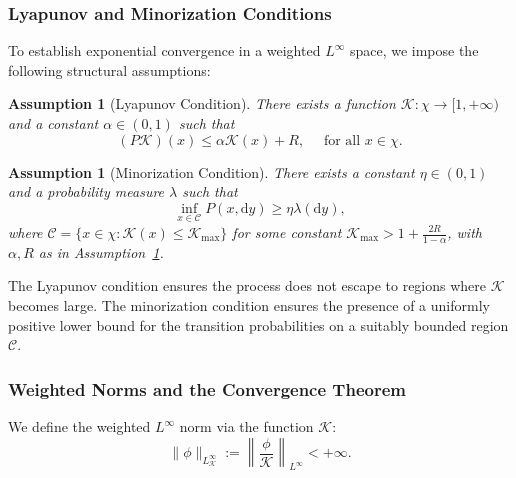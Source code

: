 \documentclass[11pt, twoside]{report}
\newtheorem{assumption}[theorem]{Assumption}
\begin{document}
\subsubsection{Lyapunov and Minorization Conditions}

To establish exponential convergence in a weighted $L^\infty$ space, we impose the following structural assumptions:

\begin{assumption}[Lyapunov Condition] \label{ass:lyapunov}
There exists a function $\mathcal{K} : \chi \to [1, +\infty)$ and a constant $\alpha \in (0,1)$ such that
\[
(P\mathcal{K})(x) \leq \alpha \mathcal{K}(x) + R, \quad \text{ for all } x \in \chi.
\]
\end{assumption}

\begin{assumption}[Minorization Condition] \label{ass:minorization}
There exists a constant $\eta \in (0,1)$ and a probability measure $\lambda$ such that
\[
\inf_{x \in \mathcal{C}} P(x, \mathrm{d}y) \geq \eta \lambda(\mathrm{d}y),
\]
where $\mathcal{C} = \{x \in \chi : \mathcal{K}(x) \leq \mathcal{K}_{\max}\}$ for some constant $\mathcal{K}_{\max} > 1 + \frac{2R}{1 - \alpha}$, with $\alpha, R$ as in Assumption~\ref{ass:lyapunov}.
\end{assumption}

The Lyapunov condition ensures the process does not escape to regions where $\mathcal{K}$ becomes large. The minorization condition ensures the presence of a uniformly positive lower bound for the transition probabilities on a suitably bounded region $\mathcal{C}$.

\subsubsection{Weighted Norms and the Convergence Theorem}

We define the weighted $L^\infty$ norm via the function $\mathcal{K}$:
\[
\|\phi\|_{L^\infty_\mathcal{K}} := \left\| \frac{\phi}{\mathcal{K}} \right\|_{L^\infty} < +\infty.
\]
\end{document}
